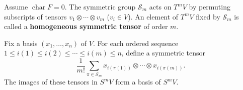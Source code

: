 Assume $\operatorname{char} F = 0$. The symmetric group $\mathcal{S}_m$ acts on $T^m V$ by permuting subscripts of tensors $v_1 \otimes \cdots \otimes v_m$ ($v_i \in V$). An element of $T^m V$ fixed by $\mathcal{S}_m$ is called a \textbf{homogeneous symmetric tensor} of order $m$.

Fix a basis $(x_1, \ldots, x_n)$ of $V$. For each ordered sequence $1 \leq i(1) \leq i(2) \leq \cdots \leq i(m) \leq n$, define a symmetric tensor
$$\frac{1}{m!} \sum_{\pi \in \mathcal{S}_m} x_{i(\pi(1))} \otimes \cdots \otimes x_{i(\pi(m))}.$$
The images of these tensors in $S^m V$ form a basis of $S^m V$.
